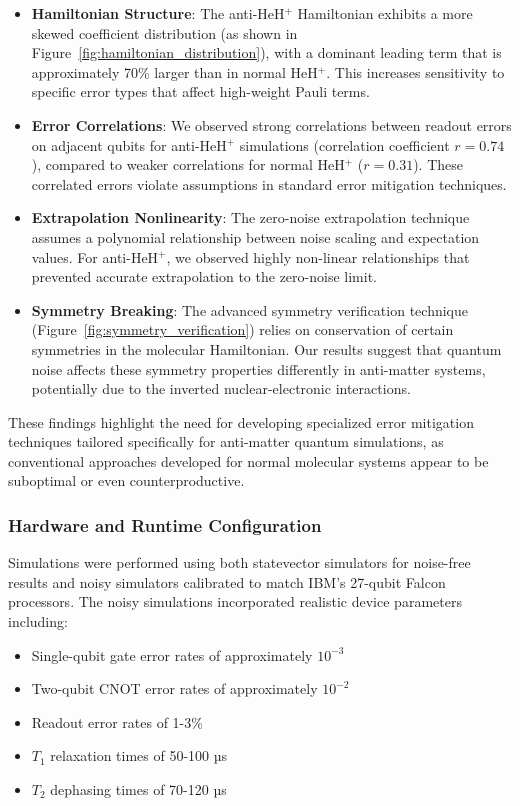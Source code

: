 \documentclass[10pt,twocolumn,a4paper]{article}
\begin{document}
\begin{itemize}
    \item \textbf{Hamiltonian Structure}: The anti-HeH$^+$ Hamiltonian exhibits a more skewed coefficient distribution (as shown in Figure~\ref{fig:hamiltonian_distribution}), with a dominant leading term that is approximately 70\% larger than in normal HeH$^+$. This increases sensitivity to specific error types that affect high-weight Pauli terms.
    
    \item \textbf{Error Correlations}: We observed strong correlations between readout errors on adjacent qubits for anti-HeH$^+$ simulations (correlation coefficient $r = 0.74$), compared to weaker correlations for normal HeH$^+$ ($r = 0.31$). These correlated errors violate assumptions in standard error mitigation techniques.
    
    \item \textbf{Extrapolation Nonlinearity}: The zero-noise extrapolation technique assumes a polynomial relationship between noise scaling and expectation values. For anti-HeH$^+$, we observed highly non-linear relationships that prevented accurate extrapolation to the zero-noise limit.
    
    \item \textbf{Symmetry Breaking}: The advanced symmetry verification technique (Figure~\ref{fig:symmetry_verification}) relies on conservation of certain symmetries in the molecular Hamiltonian. Our results suggest that quantum noise affects these symmetry properties differently in anti-matter systems, potentially due to the inverted nuclear-electronic interactions.
\end{itemize}

These findings highlight the need for developing specialized error mitigation techniques tailored specifically for anti-matter quantum simulations, as conventional approaches developed for normal molecular systems appear to be suboptimal or even counterproductive.

\subsubsection{Hardware and Runtime Configuration}
Simulations were performed using both statevector simulators for noise-free results and noisy simulators calibrated to match IBM's 27-qubit Falcon processors. The noisy simulations incorporated realistic device parameters including:
\begin{itemize}
    \item Single-qubit gate error rates of approximately $10^{-3}$
    \item Two-qubit CNOT error rates of approximately $10^{-2}$
    \item Readout error rates of 1-3\%
    \item $T_1$ relaxation times of 50-100 µs
    \item $T_2$ dephasing times of 70-120 µs
\end{itemize}
\end{document}
